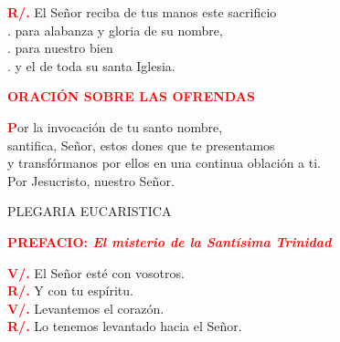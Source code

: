 \documentclass[12pt, letterpaper, spanish]{report}
\begin{document}
\Large \hspace{-0.9cm} {\bfseries \textcolor{red}{R/.}} \hspace{0.5cm} El Se\~nor reciba de tus manos este sacrificio \\
.\hspace{1.5cm} para alabanza y gloria de su nombre, \\
.\hspace{1.5cm} para nuestro bien \\
.\hspace{1.5cm} y el de toda su santa Iglesia. \newline

\Large {\bfseries \textcolor{red}{ORACI\'ON SOBRE LAS OFRENDAS}} \newline

\Large \lettrine{\bfseries \textcolor{red}{P}}{}or la invocaci\'on de tu santo nombre, \\
santifica, Se\~nor, estos dones que te presentamos \\
y transf\'ormanos por ellos en una continua oblaci\'on a ti. \\
Por Jesucristo, nuestro Se\~nor. \newline

\begin{center}
\Large PLEGARIA EUCARISTICA
\end{center}

\Large {\bfseries \textcolor{red}{PREFACIO: \em \large El misterio de la Sant\'isima Trinidad}} \newline

\Large \hspace{-0.9cm} {\bfseries \textcolor{red}{V/.}} \hspace{0.5cm} El Se\~nor est\'e con vosotros. \\
\Large \hspace{-0.9cm} {\bfseries \textcolor{red}{R/.}} \hspace{0.5cm} Y con tu esp\'iritu. \\

\Large \hspace{-0.9cm} {\bfseries \textcolor{red}{V/.}} \hspace{0.5cm} Levantemos el coraz\'on. \\
\Large \hspace{-0.9cm} {\bfseries \textcolor{red}{R/.}} \hspace{0.5cm} Lo tenemos levantado hacia el Se\~nor. \\
\end{document}
